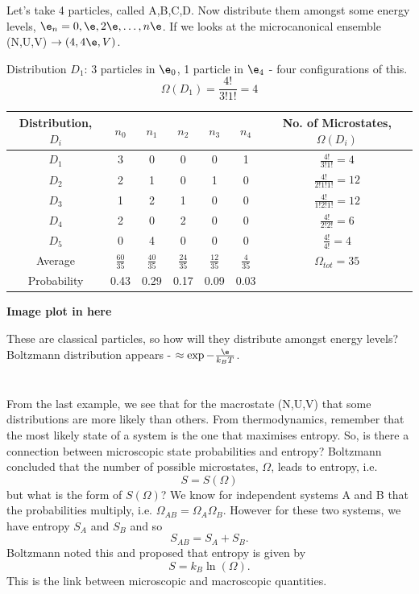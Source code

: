\documentclass[a4paper, 11pt, normalem]{report}
\begin{document}
\begin{example}
Let's take 4 particles, called A,B,C,D.
Now distribute them amongst some energy levels, $\e_n = 0, \e, 2\e, \dots, n\e$.
If we looks at the microcanonical ensemble (N,U,V) $\to (4,4\e,V)$.

Distribution $D_1$: 3 particles in $\e_0$, 1 particle in $\e_4$ - four configurations of this.
\begin{equation}
    \Omega(D_1) = \frac{4!}{3!1!} = 4
\end{equation}
\begin{table}[H]
\centering
\begin{tabular}{|c||c|c|c|c|c||c|}
    \hline
    Distribution, $D_i$ & $n_0$ & $n_1$ & $n_2$ & $n_3$ & $n_4$ & No. of Microstates, $\Omega(D_i)$ \\
    \hline
    $D_1$ & 3 & 0 & 0 & 0 & 1 & $\frac{4!}{3!1!} = 4$ \\
    $D_2$ & 2 & 1 & 0 & 1 & 0 & $\frac{4!}{2!1!1!} = 12$ \\
    $D_3$ & 1 & 2 & 1 & 0 & 0 & $\frac{4!}{1!2!1!} = 12$ \\
    $D_4$ & 2 & 0 & 2 & 0 & 0 & $\frac{4!}{2!2!} = 6$ \\
    $D_5$ & 0 & 4 & 0 & 0 & 0 & $\frac{4!}{4!} = 4$ \\
    \hline
    Average & $\frac{60}{35}$ & $\frac{40}{35}$ & $\frac{24}{35}$ & $\frac{12}{35}$ & $\frac{4}{35}$ & $\Omega_{tot} = 35$ \\
    \hline
    Probability & 0.43 & 0.29 & 0.17 & 0.09 & 0.03 & \\
    \hline
\end{tabular}
\end{table}
\textbf{Image plot in here}

These are classical particles, so how will they distribute amongst energy levels? Boltzmann distribution appears - $\approx \exp{-\frac{\e}{k_BT}}$.
\end{example}

\chapter{}
From the last example, we see that for the macrostate (N,U,V) that some distributions are more likely than others.
From thermodynamics, remember that the most likely state of a system is the one that maximises entropy.
So, is there a connection between microscopic state probabilities and entropy?
Boltzmann concluded that the number of possible microstates, $\Omega$, leads to entropy, i.e.
\begin{equation}
    S = S(\Omega)
\end{equation}
but what is the form of $S(\Omega)$?
We know for independent systems A and B that the probabilities multiply, i.e. $\Omega_{AB} = \Omega_A\Omega_B$.
However for these two systems, we have entropy $S_A$ and $S_B$ and so
\begin{equation}
    S_{AB} = S_A + S_B.
\end{equation}
Boltzmann noted this and proposed that entropy is given by
\begin{equation}
    S = k_B\ln(\Omega).
\end{equation}
This is the link between microscopic and macroscopic quantities.
\end{document}
